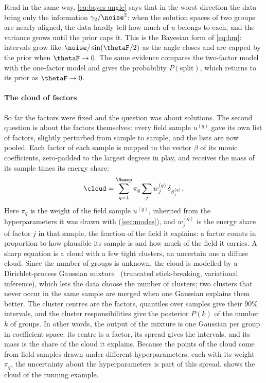 Read in the same way, \eqref{eq:bayes-angle} says that in the worst direction the data bring only the information
$\gamma_2/\noise^2$: when the solution spaces of two groups are nearly aligned, the data hardly tell how much of $u$
belongs to each, and the variance grows until the prior caps it. This is the Bayesian form of \eqref{eq:hm}: intervals grow like $\noise/\sin(\thetaF/2)$ as the angle closes and are capped
by the prior when $\thetaF\to0$. The same evidence compares the two-factor model with the one-factor model and gives the
probability $P(\text{split})$, which returns to its prior as $\thetaF\to0$.

\paragraph{The cloud of factors} So far the factors were fixed and the question was about solutions. The second question is
about the factors themselves: every field sample $u^{(q)}$ gave its own list of factors, slightly perturbed from sample to
sample, and the lists are now pooled. Each factor of each sample is mapped to the vector $\beta$ of its monic coefficients,
zero-padded to the largest degrees in play, and receives the mass of its sample times its energy share:
\begin{equation}\label{eq:cloud}
  \cloud=\sum_{q=1}^{\Nsamp}\pi_q\sum_jw_j^{(q)}\,\delta_{\beta_j^{(q)}} .
\end{equation}
Here $\pi_q$ is the weight of the field sample $u^{(q)}$, inherited from the hyperparameters it was drawn with
(\cref{sec:modes}), and $w_j^{(q)}$ is the energy share of factor $j$ in that sample, the fraction of the field it
explains: a factor counts in proportion to how plausible its sample is and how much of the field it carries. A sharp equation is a cloud with a few tight clusters, an uncertain one a diffuse cloud. Since the number of groups is
unknown, the cloud is modelled by a Dirichlet-process Gaussian mixture~\cite{BleJor06} (truncated stick-breaking,
variational inference), which lets the data choose the number of clusters; two clusters that never occur in the same
sample are merged when one Gaussian explains them better. The cluster centres are the factors, quantiles over samples
give their $90\%$ intervals, and the cluster responsibilities give the posterior $P(k)$ of the number $k$ of groups. In other words, the output of the mixture is one Gaussian per group in coefficient space: its centre is a factor,
its spread gives the intervals, and its mass is the share of the cloud it explains. Because the points of the cloud
come from field samples drawn under different hyperparameters, each with its weight $\pi_q$, the uncertainty about the
hyperparameters is part of this spread.
 shows the cloud of the running example.

